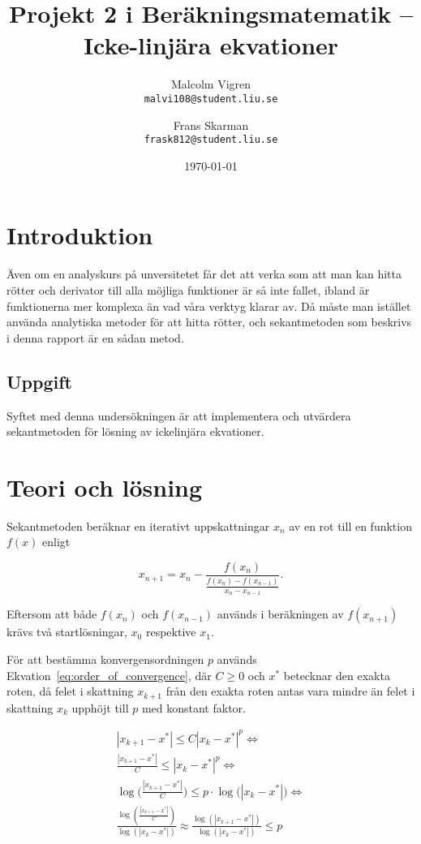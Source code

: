 \documentclass[a4paper,titlepage]{article}
\title{%
    \textbf{Projekt 2 i Beräkningsmatematik -- Icke-linjära ekvationer }}
\date{\today}
\author{%
    Malcolm Vigren \\
    \texttt{malvi108@student.liu.se}
    \and
    Frans Skarman\\
    \texttt{frask812@student.liu.se}
    }
\begin{document}
\maketitle
\newpage
\tableofcontents
\newpage

\section{Introduktion}

Även om en analyskurs på unversitetet får det att verka som att man kan hitta rötter
och derivator till alla möjliga funktioner är så inte fallet, ibland är funktionerna
mer komplexa än vad våra verktyg klarar av. Då måste man istället använda analytiska metoder
för att hitta rötter, och sekantmetoden som beskrivs i denna rapport är en sådan metod.

\subsection{Uppgift}

Syftet med denna undersökningen är att implementera och utvärdera sekantmetoden
för lösning av ickelinjära ekvationer.


\section{Teori och lösning}

Sekantmetoden beräknar en iterativt uppskattningar $x_n$ av en rot till en
funktion $f(x)$ enligt

\begin{equation}
    \label{eq:seq}
    x_{n+1} = x_{n} -
    \frac{f(x_n)}
        {\frac{f(x_n) - f(x_{n-1})}
                {x_n - x_{n-1}}
        }.
\end{equation}

Eftersom att både $f(x_n)$ och $f(x_{n-1})$ används i beräkningen av $f(x_{n+1})$ krävs
två startlösningar, $x_0$ respektive $x_1$.

För att bestämma konvergensordningen $p$ används Ekvation~\ref{eq:order_of_convergence}, där
$C \geq 0$ och $x^*$ betecknar den exakta roten, då felet i skattning $x_{k+1}$ 
från den exakta roten antas vara mindre än felet i skattning $x_{k}$ upphöjt till
$p$ med konstant faktor.

\begin{equation}
    \begin{gathered}
        |x_{k+1} - x^*| \leq C |x_k - x^*|^p \Leftrightarrow \\
        \frac{|x_{k+1} - x^*|}{C} \leq |x_{k} - x^*|^p \Leftrightarrow \\
        \log\big(\frac{|x_{k+1} - x^*|}{C} \big) \leq
            p \cdot \log\big(|x_{k} - x^*|\big) \Leftrightarrow \\
        \frac{\log(\frac{|x_{k+1} - x^*|}{C})}
            {\log(|x_{k} - x^*|)}
        \approx \frac{\log(|x_{k+1} - x^*|)}
            {\log(|x_{k} - x^*|)} \leq p \\
    \end{gathered}
    \label{eq:order_of_convergence}
\end{equation}
\end{document}
